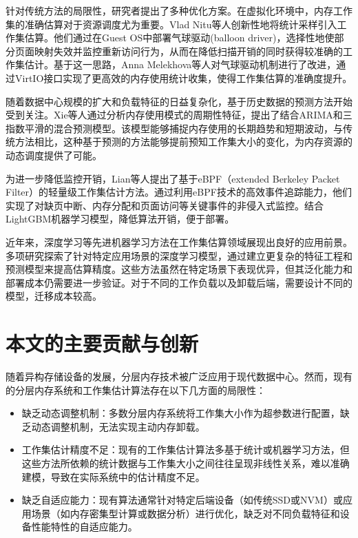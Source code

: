 针对传统方法的局限性，研究者提出了多种优化方案。在虚拟化环境中，内存工作集的准确估算对于资源调度尤为重要。Vlad Nitu等人创新性地将统计采样引入工作集估算。他们通过在Guest OS中部署气球驱动(balloon driver)，选择性地使部分页面映射失效并监控重新访问行为，从而在降低扫描开销的同时获得较准确的工作集估计。基于这一思路，Anna Melekhova等人对气球驱动机制进行了改进，通过VirtIO接口实现了更高效的内存使用统计收集，使得工作集估算的准确度提升。

随着数据中心规模的扩大和负载特征的日益复杂化，基于历史数据的预测方法开始受到关注。Xie等人通过分析内存使用模式的周期性特征，提出了结合ARIMA和三指数平滑的混合预测模型。该模型能够捕捉内存使用的长期趋势和短期波动，与传统方法相比，这种基于预测的方法能够提前预知工作集大小的变化，为内存资源的动态调度提供了可能。

为进一步降低监控开销，Lian等人提出了基于eBPF（extended Berkeley Packet Filter）的轻量级工作集估计方法。通过利用eBPF技术的高效事件追踪能力，他们实现了对缺页中断、内存分配和页面访问等关键事件的非侵入式监控。结合LightGBM机器学习模型，降低算法开销，便于部署。

近年来，深度学习等先进机器学习方法在工作集估算领域展现出良好的应用前景。多项研究探索了针对特定应用场景的深度学习模型，通过建立更复杂的特征工程和预测模型来提高估算精度。这些方法虽然在特定场景下表现优异，但其泛化能力和部署成本仍需要进一步验证。对于不同的工作负载以及卸载后端，需要设计不同的模型，迁移成本较高。


\section{本文的主要贡献与创新}

随着异构存储设备的发展，分层内存技术被广泛应用于现代数据中心。然而，现有的分层内存系统和工作集估计算法存在以下几方面的局限性：

\begin{itemize}
    \item 缺乏动态调整机制：多数分层内存系统将工作集大小作为超参数进行配置，缺乏动态调整机制，无法实现主动内存卸载。
    \item 工作集估计精度不足：现有的工作集估计算法多基于统计或机器学习方法，但这些方法所依赖的统计数据与工作集大小之间往往呈现非线性关系，难以准确建模，导致在实际系统中的估计精度不足。
    \item 缺乏自适应能力：现有算法通常针对特定后端设备（如传统SSD或NVM）或应用场景（如内存密集型计算或数据分析）进行优化，缺乏对不同负载特征和设备性能特性的自适应能力。
\end{itemize}


